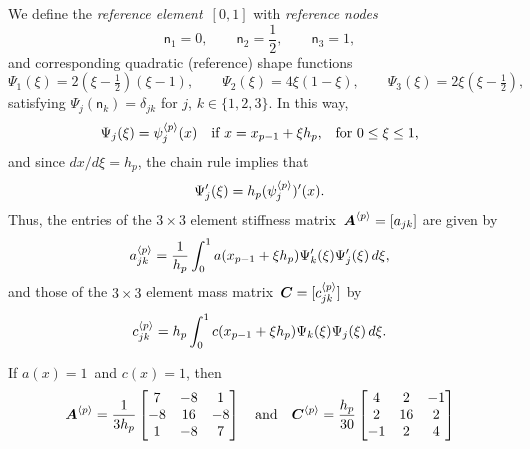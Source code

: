 We define the \emph{reference element}~$[0,1]$ with \emph{reference nodes}
\[
\mathsf{n}_1=0,\qquad\mathsf{n}_2=\frac{1}{2},\qquad\mathsf{n}_3=1,
\]
and corresponding quadratic (reference) shape functions
\begin{equation}\label{eq: quadratic shape funcs 1d}
\Psi_1(\xi)=2(\xi-\tfrac12)(\xi-1),\qquad
\Psi_2(\xi)=4\xi(1-\xi),\qquad
\Psi_3(\xi)=2\xi(\xi-\tfrac12),
\end{equation}
satisfying $\Psi_j(\mathsf{n}_k)=\delta_{jk}$ for $j$, $k\in\{1,2,3\}$.  
In this way,
\[
\Psi_j(\xi)=\psi^{\langle p\rangle}_j(x)\quad
	\text{if $x=x_{p-1}+\xi h_p$,}\quad\text{for $0\le\xi\le1$,}
\]
and since $dx/d\xi=h_p$, the chain rule implies that
\[
\Psi'_j(\xi)=h_p(\psi^{\langle p\rangle}_j)'(x).
\]
Thus, the entries of the $3\times3$ element stiffness 
matrix~$\boldsymbol{A}^{\langle p\rangle}=[a_{jk}]$ are given by
\begin{equation}\label{eq: a reference 1d}
a^{\langle p\rangle}_{jk}=\frac{1}{h_p}\int_0^1a(x_{p-1}+\xi h_p)
	\Psi'_k(\xi)\Psi'_j(\xi)\,d\xi,
\end{equation}
and those of the $3\times3$ element mass 
matrix~$\boldsymbol{C}=[c^{\langle p\rangle}_{jk}]$ by
\begin{equation}\label{eq: c reference 1d}
c^{\langle p\rangle}_{jk}=h_p\int_0^1c(x_{p-1}+\xi h_p)
	\Psi_k(\xi)\Psi_j(\xi)\,d\xi.
\end{equation}

\begin{example}\label{ex: quadratic Am Cm}
If $a(x)=1$~and $c(x)=1$, then
\begin{equation}\label{eq: element matrices quadratic 1d}
\boldsymbol{A}^{\langle p\rangle}=\frac{1}{3h_p}\begin{bmatrix}
 7&-8& 1\\
-8&16&-8\\
 1&-8& 7\end{bmatrix}
\quad\text{and}\quad
\boldsymbol{C}^{\langle p\rangle}=\frac{h_p}{30}\begin{bmatrix}
 4& 2&-1\\
 2&16& 2\\
-1& 2& 4 \end{bmatrix}
\end{equation}
\end{example}

